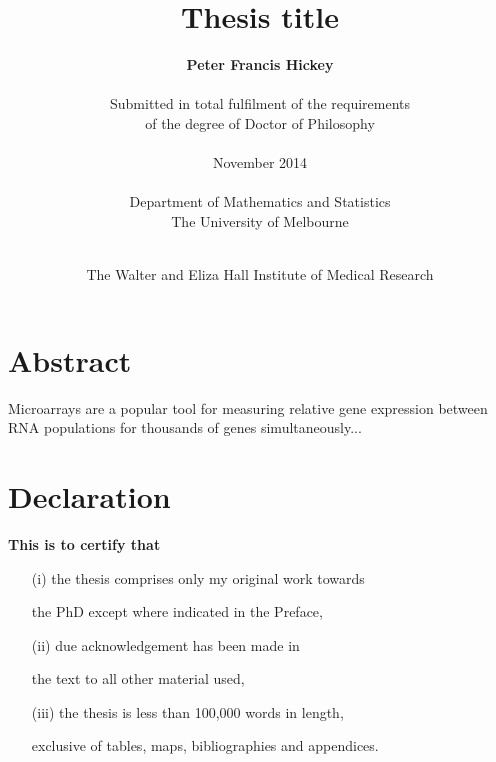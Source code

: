 \documentclass[11pt,a4paper,oneside]{book}	%
\begin{document}


\title{\huge \bf Thesis title\\}

\author{{\bf \Large Peter Francis Hickey}\\\\
Submitted in total fulfilment of the requirements\\
of the degree of Doctor of Philosophy\\\\
November 2014\\\\
Department of Mathematics and Statistics\\
The University of Melbourne\\\\}

\date{The Walter and Eliza Hall Institute of Medical Research}

\maketitle

\frontmatter

\chapter{Abstract}


Microarrays are a popular tool for measuring relative gene expression between RNA populations for thousands of genes simultaneously...


\chapter{Declaration}

{\bf This is to certify that}

\begin{itemize}

\item [(i)] the thesis comprises only my original work towards

the PhD except where indicated in the Preface,

\item [(ii)] due acknowledgement has been made in

the text to all other material used,

\item [(iii)] the thesis is less than 100,000 words in length,

exclusive of tables, maps, bibliographies and appendices.

\end{itemize}
\end{document}
